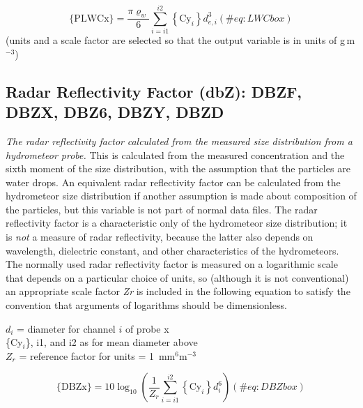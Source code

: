\documentclass[
  english,
]{book}
\begin{document}
\begin{equation}
\mathrm{\{PLWCx\}}=\frac{\pi\varrho_{w}}{6}{\textstyle \sum_{i=i1}^{i2}}{\displaystyle {\displaystyle \left\{ \mathrm{Cy}_{i}\right\} d_{e,i}^{3}}}
(\#eq:LWCbox)
\end{equation} (units and a scale factor are selected so that the output
variable is in units of g\(\,\)m\(^{-3}\))

\hypertarget{DBZ}{%
\subsection*{Radar Reflectivity Factor (dbZ): DBZF, DBZX, DBZ6, DBZY,
DBZD}\label{DBZ}}

\emph{The radar reflectivity factor} \emph{calculated from the measured
size distribution from a hydrometeor probe.} This is calculated from the
measured concentration and the sixth moment of the size distribution,
with the assumption that the particles are water drops. An equivalent
radar reflectivity factor can be calculated from the hydrometeor size
distribution if another assumption is made about composition of the
particles, but this variable is not part of normal data files. The radar
reflectivity factor is a characteristic only of the hydrometeor size
distribution; it is \emph{not} a measure of radar reflectivity, because
the latter also depends on wavelength, dielectric constant, and other
characteristics of the hydrometeors. The normally used radar
reflectivity factor is measured on a logarithmic scale that depends on a
particular choice of units, so (although it is not conventional) an
appropriate scale factor {\emph{Z}\emph{r}} is included in the following
equation to satisfy the convention that arguments of logarithms should
be dimensionless.

\(d_{i}\) = diameter for channel \(i\) of probe x\\
\{Cy\(_{i}\)\}, i1, and i2 as for mean diameter above\\
\(Z_{r}\)
= reference factor for units = 1~mm\(^{6}\)m\(^{-3}\)

\begin{equation}
\mathrm{\{DBZx\}}=10\log_{10}\left({\textstyle \frac{1}{Z_{r}}\sum_{i=i1}^{i2}}{\displaystyle {\displaystyle \left\{ \mathrm{Cy}_{i}\right\} d_{i}^{6}}}\right)
(\#eq:DBZbox)
\end{equation}
\end{document}
